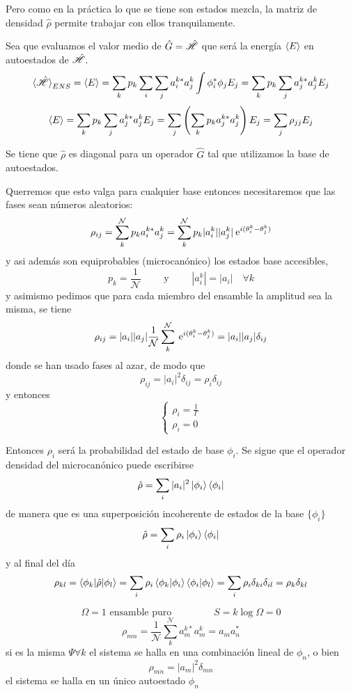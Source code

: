 \documentclass[10pt,oneside]{CBFT_book}
\begin{document}
Pero como en la práctica lo que se tiene son estados mezcla, la matriz de densidad $\hat{\rho}$ permite trabajar
con ellos tranquilamente.

Sea que evaluamos el valor medio de $ \hat{G} = \hat{\mathscr{H}} $ que será la energía $\braket{E}$ en autoestados de 
$ \hat{\mathscr{H}} $.
\[
	\braket{\hat{\mathscr{H}}}_{ENS} = \braket{E} = \sum_k p_k \sum_i \sum_j a_i^{k*} a_j^k \int \phi_i^* \phi_j E_j =
	\sum_k p_k \sum_j a_j^{k*} a_j^k E_j
\]
\[
	\braket{E} = \sum_k p_k \sum_j a_j^{k*} a_j^k E_j = \sum_j \left( \sum_k p_k a_j^{k*} a_j^k \right) E_j =
	\sum_j \rho_{jj} E_j
\]

Se tiene que $ \hat{\rho} $ es diagonal para un operador $\hat{G}$ tal que utilizamos la base de autoestados.

Querremos que esto valga para cualquier base entonces necesitaremos que las fases sean números aleatorios:
\[
	\rho_{ij} = \sum_k^\mathcal{N} p_k a_i^{k*} a_j^k = 
	\sum_k^\mathcal{N} p_k | a_i^k | | a_j^k |\:\mathrm{e}^{i( \theta_i^k - \theta_j^k )}
\]
y asi además son equiprobables (microcanónico) los estados base accesibles,
\[
	p_k = \frac{1}{\mathcal{N}} \qquad \text{ y } \qquad |a^k_i| = |a_i| \quad \forall k
\]
y asimismo pedimos que para cada miembro del ensamble la amplitud sea la misma, se tiene 
\[
	\rho_{ij} = | a_i | | a_j | \frac{1}{\mathcal{N}} \sum_k^\mathcal{N} \:\mathrm{e}^{i( \theta_i^k - \theta_j^k )}
	= | a_i | | a_j | \delta_{ij}
\]
donde se han usado fases al azar, de modo que 
\[
	\rho_{ij} = | a_i |^2 \delta_{ij} = \rho_i \delta_{ij}
\]
y entonces 
\[
	\begin{cases}
	 \rho_i = \displaystyle{ \frac{1}{\Gamma} }\\
	 \rho_i = 0
	\end{cases}
\]

Entonces $ \rho_i $ será la probabilidad del estado de base $ \phi_i $. Se sigue que el operador densidad del
microcanónico puede escribirse 
\[
	\hat{\rho} = \sum_i | a_i |^2 \Ket{\phi_i}\Bra{\phi_i}
\]
de manera que es una superposición incoherente de estados de la base $\{ \phi_i \}$
\[
	\hat{\rho} = \sum_i \rho_i \Ket{\phi_i}\Bra{\phi_i}
\]
y al final del día
\[
	\rho_{kl} = \braket{ \phi_k | \hat{\rho} | \phi_l } = \sum_i \rho_i 
	\braket{ \phi_k | \phi_i }  \braket{ \phi_i | \phi_l } = \sum_i \rho_i \delta_{ki} \delta_{il} = 
	\rho_k \delta_{kl}
\]

\[
	\Omega = 1 \text{ ensamble puro } \qquad \qquad S = k\log \Omega = 0
\]
\[
	\rho_{mn} = \frac{1}{\mathcal{N}} \sum_k^\mathcal{N} a_m^{k*} a_m^k = a_m a_n^* 
\]
si es la misma $\Psi \forall k$ el sistema se halla en una combinación lineal de $\phi_n$, o bien
\[
	\rho_{mn} = |a_m|^2 \delta_{mn}
\]
el sistema se halla en un único autoestado $ \phi_n $
\end{document}
